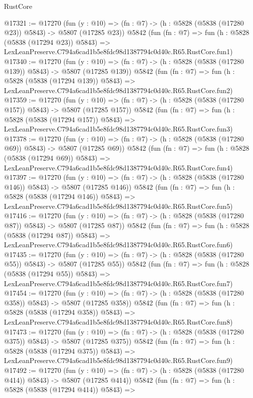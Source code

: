 \begin{lexlean}{RustCore}
\begin{coremodule}
@17321 := @17270
    (fun (y : @10) => (fn : @7) -> (h : @5828 (@5838 (@17280 @23)) @5843) -> @5807 (@17285 @23))
    @5842
    (fun (fn : @7) =>
    fun (h : @5828 (@5838 (@17294 @23)) @5843) =>
    LexLeanPreserve.C794a6cad1b5e8fdc98d1387794c0d40c.R65.RustCore.fun1)
@17340 := @17270
    (fun (y : @10) => (fn : @7) -> (h : @5828 (@5838 (@17280 @139)) @5843) -> @5807 (@17285 @139))
    @5842
    (fun (fn : @7) =>
    fun (h : @5828 (@5838 (@17294 @139)) @5843) =>
    LexLeanPreserve.C794a6cad1b5e8fdc98d1387794c0d40c.R65.RustCore.fun2)
@17359 := @17270
    (fun (y : @10) => (fn : @7) -> (h : @5828 (@5838 (@17280 @157)) @5843) -> @5807 (@17285 @157))
    @5842
    (fun (fn : @7) =>
    fun (h : @5828 (@5838 (@17294 @157)) @5843) =>
    LexLeanPreserve.C794a6cad1b5e8fdc98d1387794c0d40c.R65.RustCore.fun3)
@17378 := @17270
    (fun (y : @10) => (fn : @7) -> (h : @5828 (@5838 (@17280 @69)) @5843) -> @5807 (@17285 @69))
    @5842
    (fun (fn : @7) =>
    fun (h : @5828 (@5838 (@17294 @69)) @5843) =>
    LexLeanPreserve.C794a6cad1b5e8fdc98d1387794c0d40c.R65.RustCore.fun4)
@17397 := @17270
    (fun (y : @10) => (fn : @7) -> (h : @5828 (@5838 (@17280 @146)) @5843) -> @5807 (@17285 @146))
    @5842
    (fun (fn : @7) =>
    fun (h : @5828 (@5838 (@17294 @146)) @5843) =>
    LexLeanPreserve.C794a6cad1b5e8fdc98d1387794c0d40c.R65.RustCore.fun5)
@17416 := @17270
    (fun (y : @10) => (fn : @7) -> (h : @5828 (@5838 (@17280 @87)) @5843) -> @5807 (@17285 @87))
    @5842
    (fun (fn : @7) =>
    fun (h : @5828 (@5838 (@17294 @87)) @5843) =>
    LexLeanPreserve.C794a6cad1b5e8fdc98d1387794c0d40c.R65.RustCore.fun6)
@17435 := @17270
    (fun (y : @10) => (fn : @7) -> (h : @5828 (@5838 (@17280 @55)) @5843) -> @5807 (@17285 @55))
    @5842
    (fun (fn : @7) =>
    fun (h : @5828 (@5838 (@17294 @55)) @5843) =>
    LexLeanPreserve.C794a6cad1b5e8fdc98d1387794c0d40c.R65.RustCore.fun7)
@17454 := @17270
    (fun (y : @10) => (fn : @7) -> (h : @5828 (@5838 (@17280 @358)) @5843) -> @5807 (@17285 @358))
    @5842
    (fun (fn : @7) =>
    fun (h : @5828 (@5838 (@17294 @358)) @5843) =>
    LexLeanPreserve.C794a6cad1b5e8fdc98d1387794c0d40c.R65.RustCore.fun8)
@17473 := @17270
    (fun (y : @10) => (fn : @7) -> (h : @5828 (@5838 (@17280 @375)) @5843) -> @5807 (@17285 @375))
    @5842
    (fun (fn : @7) =>
    fun (h : @5828 (@5838 (@17294 @375)) @5843) =>
    LexLeanPreserve.C794a6cad1b5e8fdc98d1387794c0d40c.R65.RustCore.fun9)
@17492 := @17270
    (fun (y : @10) => (fn : @7) -> (h : @5828 (@5838 (@17280 @414)) @5843) -> @5807 (@17285 @414))
    @5842
    (fun (fn : @7) =>
    fun (h : @5828 (@5838 (@17294 @414)) @5843) =>

\end{coremodule}
\end{lexlean}
